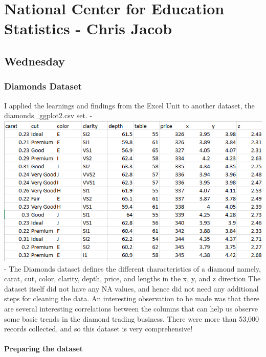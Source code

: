 \documentclass[
  letterpaper,
  DIV=11,
  numbers=noendperiod]{scrreprt}
\begin{document}

\chapter{National Center for Education Statistics - Chris
Jacob}\label{national-center-for-education-statistics---chris-jacob}

\section{Wednesday}\label{wednesday-3}

\subsection{Diamonds Dataset}\label{diamonds-dataset}

I applied the learnings and findings from the Excel Unit to another
dataset, the diamonds\_ggplot2.csv set. -
\includegraphics{./Excel_1_Unit/Week1_Chris/VIZ_step1.png} - The
Diamonds dataset defines the different characteristics of a diamond
namely, carat, cut, color, clarity, depth, price, and lengths in the x,
y, and z direction The dataset itself did not have any NA values, and
hence did not need any additional steps for cleaning the data. An
interesting observation to be made was that there are several
interesting correlations between the columns that can help us observe
some basic trends in the diamond trading business. There were more than
53,000 records collected, and so this dataset is very comprehensive!

\subsubsection{Preparing the dataset}\label{preparing-the-dataset}
\end{document}
